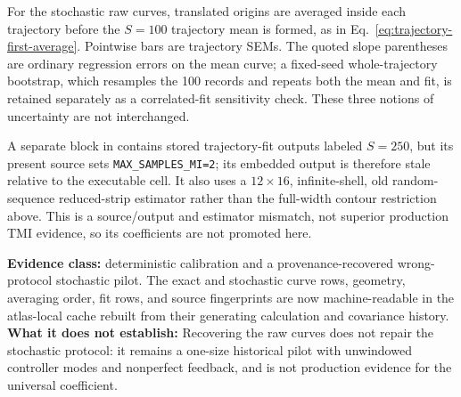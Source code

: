 \documentclass[aps,prb,twocolumn,floatfix,nofootinbib,superscriptaddress]{revtex4-2}
\newcommand{\evidence}[1]{\textbf{Evidence class:} #1}
\newcommand{\limittext}[1]{\textbf{What it does not establish:} #1}
\newcommand{\subfolder}[1]{\path{#1}}
\begin{document}
For the stochastic raw curves, translated origins are averaged inside each trajectory
before the $S=100$ trajectory mean is formed, as in Eq.~\eqref{eq:trajectory-first-average}.
Pointwise bars are trajectory SEMs.  The quoted slope parentheses are ordinary regression
errors on the mean curve; a fixed-seed whole-trajectory bootstrap, which resamples the
100 records and repeats both the mean and fit, is retained separately as a correlated-fit
sensitivity check.  These three notions of uncertainty are not interchanged.

A separate block in \subfolder{notebooks/analysis.ipynb} contains stored trajectory-fit
outputs labeled $S=250$, but its present source sets \texttt{MAX\_SAMPLES\_MI=2}; its
embedded output is therefore stale relative to the executable cell.  It also uses a
$12\times16$, infinite-shell, old random-sequence reduced-strip estimator rather than the
full-width contour restriction above.  This is a source/output and estimator mismatch,
not superior production TMI evidence, so its coefficients are not promoted here.

\evidence{deterministic calibration and a provenance-recovered wrong-protocol stochastic
pilot.}  The exact and stochastic curve rows, geometry, averaging order, fit rows, and
source fingerprints are now machine-readable in the atlas-local cache rebuilt from their
generating calculation and covariance history.  \limittext{Recovering the raw curves does
not repair the stochastic protocol: it remains a one-size historical pilot with
unwindowed controller modes and nonperfect feedback, and is not production evidence for
the universal coefficient.}
\end{document}

